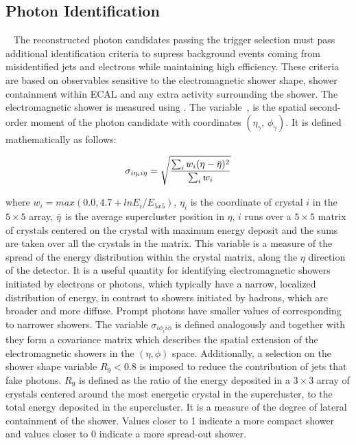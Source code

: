 \subsection{Photon Identification}~\label{subsec:photonID}
The reconstructed photon candidates passing the trigger selection must pass additional identification criteria to supress background events coming from misidentified jets and electrons while maintaining high efficiency. These criteria are based on observables sensitive to the electromagnetic shower shape, shower containment within ECAL and any extra activity surrounding the shower. The electromagnetic shower is  measured using \sieie. The \sieie variable~\cite{Khachatryan:2015iwa}, is the spatial second-order moment of the photon candidate with coordinates $(\eta_\gamma,\,\phi_\gamma)$. It is defined mathematically as follows:

\begin{equation}
    \sigma_{i\eta_{i} i\eta} = \sqrt{\frac{\sum_i w_i (\eta - \Bar{\eta})^2}{\sum_i w_i}}
\end{equation}

where $w_i = max(0.0, 4.7 + ln E_{i}/E_{5x5})$, $\eta_{i}$ is the coordinate of crystal $i$ in the $5 \times 5$ array, $\Bar{\eta}$ is the average supercluster position in $\eta$, $i$ runs over a $5\times 5$ matrix of crystals centered on the crystal with maximum energy deposit and the sums are taken over all the crystals in the matrix. This variable is a measure of the spread of the energy distribution within the crystal matrix, along the $\eta$ direction of the detector. It is a useful quantity for identifying electromagnetic showers initiated by electrons or photons, which typically have a narrow, localized distribution of energy, in contrast to showers initiated by hadrons, which are broader and more diffuse. Prompt photons have smaller values of \sieie corresponding to narrower showers. The variable $\sigma_{i\phi_{i} i\phi}$ is defined analogously and together with \sieie they form a covariance matrix which describes the spatial extension of the electromagnetic showers in the $(\eta, \phi)$ space. Additionally, a selection on the shower shape variable $R_{9} < 0.8$ is imposed to reduce the contribution of jets that fake photons. $R_{9}$ is defined as the ratio of the energy deposited in a $3\times 3$ array of crystals centered around the most energetic crystal in the supercluster, to the total energy deposited in the supercluster. It is a measure of the degree of lateral containment of the shower. Values closer to 1 indicate a more compact shower and values closer to 0 indicate a more spread-out shower. 

